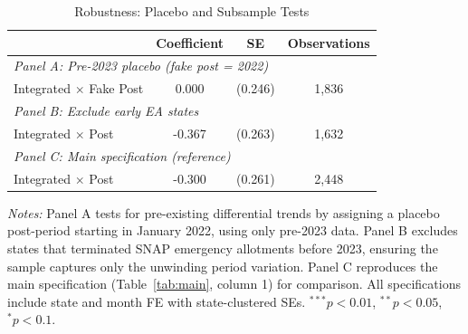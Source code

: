 \begin{table}[H]
\centering
\caption{Robustness: Placebo and Subsample Tests}
\label{tab:robustness}
\begin{threeparttable}
\begin{tabular}{lccc}
\toprule
 & Coefficient & SE & Observations \\
\midrule
\multicolumn{4}{l}{\textit{Panel A: Pre-2023 placebo (fake post = 2022)}} \\[3pt]
Integrated $\times$ Fake Post & 0.000 & (0.246) & 1,836 \\
[6pt]
\multicolumn{4}{l}{\textit{Panel B: Exclude early EA states}} \\[3pt]
Integrated $\times$ Post & -0.367 & (0.263) & 1,632 \\
[6pt]
\multicolumn{4}{l}{\textit{Panel C: Main specification (reference)}} \\[3pt]
Integrated $\times$ Post & -0.300 & (0.261) & 2,448 \\
\bottomrule
\end{tabular}
\begin{tablenotes}[flushleft]
\small
\item \textit{Notes:} Panel A tests for pre-existing differential trends by assigning a 
placebo post-period starting in January 2022, using only pre-2023 data. Panel B excludes 
states that terminated SNAP emergency allotments before 2023, ensuring the sample captures 
only the unwinding period variation. Panel C reproduces the main specification (Table~\ref{tab:main}, 
column 1) for comparison. All specifications include state and month FE with state-clustered SEs. 
$^{***}p<0.01$, $^{**}p<0.05$, $^{*}p<0.1$.
\end{tablenotes}
\end{threeparttable}
\end{table}
